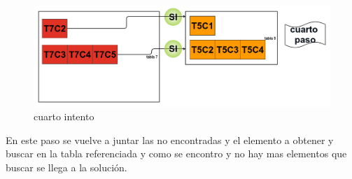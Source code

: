 \begin{figure}[H]
\centering
\includegraphics[scale=0.35]{images/paso4.png}
\caption{cuarto intento}\label{intento4}
\end{figure}
En este paso se vuelve a juntar las no encontradas y el elemento a obtener y buscar en la tabla referenciada y como se encontro y no hay mas elementos que buscar se llega a la soluci\'on.